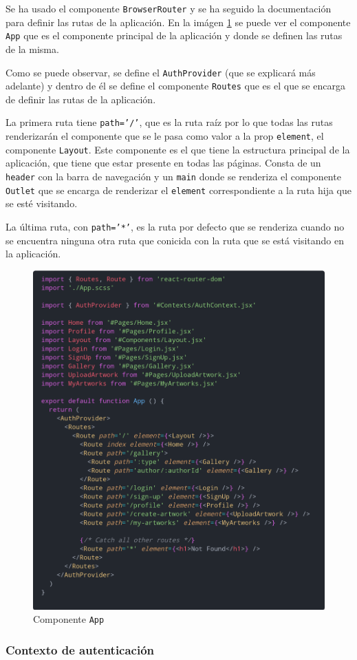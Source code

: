 Se ha usado el componente \texttt{BrowserRouter} y se ha seguido la documentación
\cite{browser-router} para definir las rutas de la aplicación. En la imágen
\ref{fig:app} se puede ver el componente \texttt{App} que es el componente principal
de la aplicación y donde se definen las rutas de la misma.

Como se puede observar, se define el \texttt{AuthProvider} (que se explicará más adelante)
y dentro de él se define el componente \texttt{Routes} que es el que se encarga de
definir las rutas de la aplicación.

La primera ruta tiene \texttt{path='/'}, que es la ruta raíz por lo que todas las rutas
renderizarán el componente que se le pasa como valor a la prop \texttt{element}, el
componente \texttt{Layout}. Este componente es el que tiene la estructura principal de la
aplicación, que tiene que estar presente en todas las páginas. Consta de un \texttt{header}
con la barra de navegación y un \texttt{main} donde se renderiza el componente
\texttt{Outlet} \cite{outlet} que se encarga de renderizar el \texttt{element}
correspondiente a la ruta hija que se esté visitando.

La última ruta, con \texttt{path='*'}, es la ruta por defecto que se renderiza cuando
no se encuentra ninguna otra ruta que conicida con la ruta que se está visitando en la
aplicación.

\begin{figure}[H]
  \centering
  \includegraphics[width=1\textwidth]{img/app}
  \caption{Componente \texttt{App}}
  \label{fig:app}
\end{figure}

\subsubsection{Contexto de autenticación}
